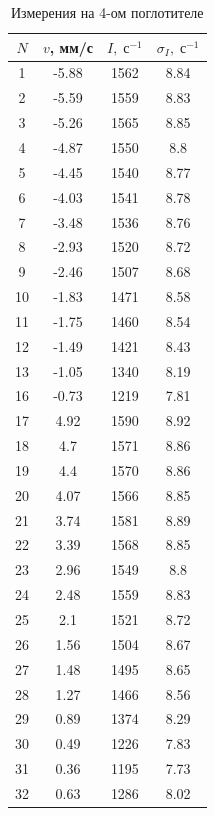 \documentclass[12pt]{kiarticle} %
\begin{document}
	\begin{table}[h!]
		\caption{Измерения на 4-ом поглотителе}
		\begin{center}
			\begin{tabular}{|c|c|c|c|}
				\hline
				$ N  $ & $ v $, мм/с &  $ I, \; с^{-1} $ & $ \sigma_I, \; с^{-1} $  \\
				\hline
				1 & -5.88 & 1562 & 8.84 \\
				2 & -5.59 & 1559 & 8.83 \\
				3 & -5.26 & 1565 & 8.85 \\
				4 & -4.87 & 1550 & 8.8 \\
				5 & -4.45 & 1540 & 8.77 \\
				6 & -4.03 & 1541 & 8.78 \\
				7 & -3.48 & 1536 & 8.76 \\
				8 & -2.93 & 1520 & 8.72 \\
				9 & -2.46 & 1507 & 8.68 \\
				10 & -1.83 & 1471 & 8.58 \\
				11 & -1.75 & 1460 & 8.54 \\
				12 & -1.49 & 1421 & 8.43 \\
				13 & -1.05 & 1340 & 8.19 \\
				16 & -0.73 & 1219 & 7.81 \\
				17 & 4.92 & 1590 & 8.92 \\
				18 & 4.7 & 1571 & 8.86 \\
				19 & 4.4 & 1570 & 8.86 \\
				20 & 4.07 & 1566 & 8.85 \\
				21 & 3.74 & 1581 & 8.89 \\
				22 & 3.39 & 1568 & 8.85 \\
				23 & 2.96 & 1549 & 8.8 \\
				24 & 2.48 & 1559 & 8.83 \\
				25 & 2.1 & 1521 & 8.72 \\
				26 & 1.56 & 1504 & 8.67 \\
				27 & 1.48 & 1495 & 8.65 \\
				28 & 1.27 & 1466 & 8.56 \\
				29 & 0.89 & 1374 & 8.29 \\
				30 & 0.49 & 1226 & 7.83 \\
				31 & 0.36 & 1195 & 7.73 \\
				32 & 0.63 & 1286 & 8.02 \\
				\hline
			\end{tabular}
		\end{center}
		\label{table_4}
	\end{table}

	
\end{document}
